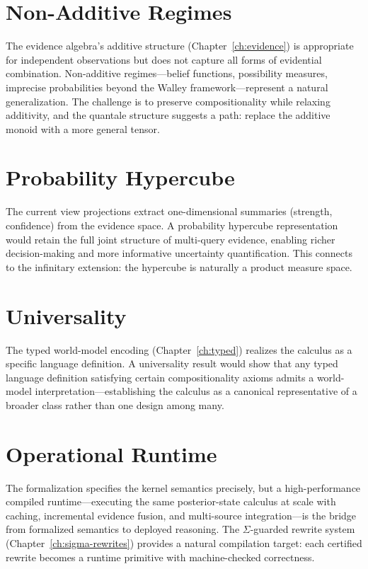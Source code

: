 \section{Non-Additive Regimes}

The evidence algebra's additive structure
(Chapter~\ref{ch:evidence}) is appropriate for independent
observations but does not capture all forms of evidential
combination.  Non-additive regimes---belief functions,
possibility measures, imprecise probabilities beyond the Walley
framework---represent a natural generalization.  The challenge is to
preserve compositionality while relaxing additivity, and the
quantale structure suggests a path: replace the additive monoid with
a more general tensor.

\section{Probability Hypercube}

The current view projections extract one-dimensional summaries
(strength, confidence) from the evidence space.  A probability
hypercube representation would retain the full joint structure of
multi-query evidence, enabling richer decision-making and more
informative uncertainty quantification.  This connects to the
infinitary extension: the hypercube is naturally a product measure
space.

\section{Universality}

The typed world-model encoding
(Chapter~\ref{ch:typed}) realizes the calculus as a specific
language definition.  A universality result would show that any typed
language definition satisfying certain compositionality axioms admits
a world-model interpretation---establishing the calculus as a
canonical representative of a broader class rather than one design
among many.

\section{Operational Runtime}

The formalization specifies the kernel semantics precisely, but a
high-performance compiled runtime---executing the same
posterior-state calculus at scale with caching, incremental evidence
fusion, and multi-source integration---is the bridge from formalized
semantics to deployed reasoning.  The $\Sigma$-guarded rewrite
system (Chapter~\ref{ch:sigma-rewrites}) provides a natural
compilation target: each certified rewrite becomes a runtime
primitive with machine-checked correctness.

